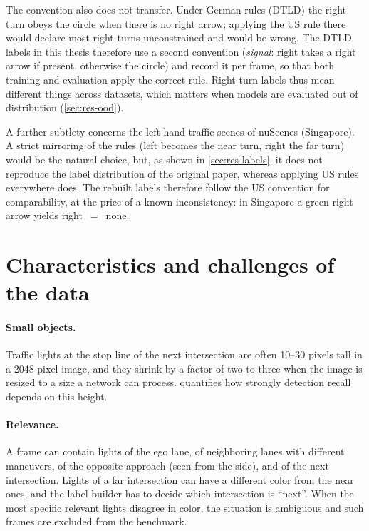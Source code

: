 The convention also does not transfer. Under German rules (DTLD) the right turn obeys the circle when
there is no right arrow; applying the US rule there would declare most right turns unconstrained and
would be wrong. The DTLD labels in this thesis therefore use a second convention (\emph{signal}: right
takes a right arrow if present, otherwise the circle) and record it per frame, so that both training
and evaluation apply the correct rule. Right-turn labels thus mean different things across datasets,
which matters when models are evaluated out of distribution (\cref{sec:res-ood}).

A further subtlety concerns the left-hand traffic scenes of nuScenes (Singapore). A strict mirroring of
the rules (left becomes the near turn, right the far turn) would be the natural choice, but, as
shown in \cref{sec:res-labels}, it does not reproduce the label distribution of the original paper,
whereas applying US rules everywhere does. The rebuilt labels therefore follow the US convention for
comparability, at the price of a known inconsistency: in Singapore a green right arrow yields
right~$=$~none.

\section{Characteristics and challenges of the data}
\label{sec:prob-challenges}

\paragraph{Small objects.} Traffic lights at the stop line of the next intersection are often 10--30
pixels tall in a 2048-pixel image, and they shrink by a factor of two to three when the image is
resized to a size a network can process.  quantifies how strongly detection
recall depends on this height.

\paragraph{Relevance.} A frame can contain lights of the ego lane, of neighboring lanes with different
maneuvers, of the opposite approach (seen from the side), and of the next intersection. Lights of a far
intersection can have a different color from the near ones, and the label builder has to decide which
intersection is ``next''. When the most specific relevant lights disagree in color, the situation is
ambiguous and such frames are excluded from the benchmark.

